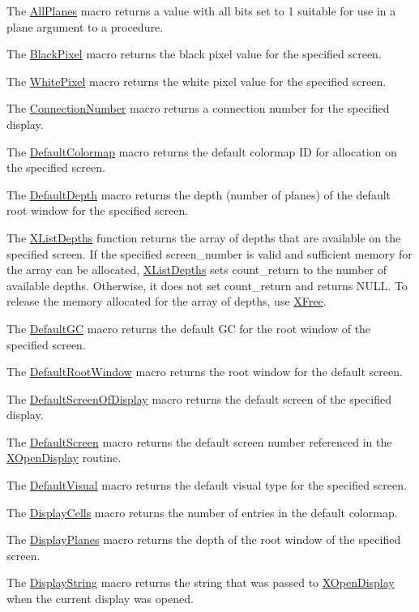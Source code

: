 \documentclass[]{article}
\renewcommand{\emph}[1]{\underline{#1}}
\begin{document}

The \emph{AllPlanes} macro returns a value with all bits set to 1
suitable for use in a plane argument to a procedure.

The \emph{BlackPixel} macro returns the black pixel value for the
specified screen.

The \emph{WhitePixel} macro returns the white pixel value for the
specified screen.

The \emph{ConnectionNumber} macro returns a connection number for the
specified display.

The \emph{DefaultColormap} macro returns the default colormap ID for
allocation on the specified screen.

The \emph{DefaultDepth} macro returns the depth (number of planes) of
the default root window for the specified screen.

The \emph{XListDepths} function returns the array of depths that are
available on the specified screen. If the specified screen\_number is
valid and sufficient memory for the array can be allocated,
\emph{XListDepths} sets count\_return to the number of available depths.
Otherwise, it does not set count\_return and returns NULL. To release
the memory allocated for the array of depths, use \emph{XFree}.

The \emph{DefaultGC} macro returns the default GC for the root window of
the specified screen.

The \emph{DefaultRootWindow} macro returns the root window for the
default screen.

The \emph{DefaultScreenOfDisplay} macro returns the default screen of
the specified display.

The \emph{DefaultScreen} macro returns the default screen number
referenced in the \emph{XOpenDisplay} routine.

The \emph{DefaultVisual} macro returns the default visual type for the
specified screen.

The \emph{DisplayCells} macro returns the number of entries in the
default colormap.

The \emph{DisplayPlanes} macro returns the depth of the root window of
the specified screen.

The \emph{DisplayString} macro returns the string that was passed to
\emph{XOpenDisplay} when the current display was opened.
\end{document}
